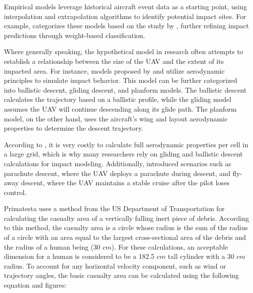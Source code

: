 \documentclass[12pt]{report}
\begin{document}
            Empirical models leverage historical aircraft event data as a starting point, using interpolation and
            extrapolation algorithms to identify potential impact sites. For example, \cite{melnyk_third-party_2014}
            categorizes these models based on the study by \cite{ale_assessment_2000}, further refining impact
            predictions through weight-based classification.
                
            Where generally speaking, the hypothetical model in research often attempts to establish a relationship
            between the size of the UAV and the extent of its impacted area. For instance, models proposed by
            \cite{primatesta_ground_2020} and \cite{burke_system-level_2011} utilize aerodynamic principles to simulate
            impact behavior. This model can be further categorized into ballistic descent, gliding descent, and planform
            models. The ballistic descent calculates the trajectory based on a ballistic profile, while the gliding
            model assumes the UAV will continue descending along its glide path. The planform model, on the other hand,
            uses the aircraft's wing and layout aerodynamic properties to determine the descent trajectory.
                
            According to \cite{primatesta_risk-based_2020}, it is very costly to calculate full aerodynamic properties
            per cell in a large grid, which is why many researchers rely on gliding and ballistic descent calculations
            for impact modeling. Additionally, \cite{primatesta_ground_2020} introduced scenarios such as parachute
            descent, where the UAV deploys a parachute during descent, and fly-away descent, where the UAV maintains a
            stable cruise after the pilot loses control.
                
            Primatesta uses a method from the US Department of Transportation \cite{faa_expected_2000} for calculating
            the casualty area of a vertically falling inert piece of debris. According to this method, the casualty area
            is a circle whose radius is the sum of the radius of a circle with an area equal to the largest
            cross-sectional area of the debris and the radius of a human being (30 \(cm\)). For these calculations, an
            acceptable dimension for a human is considered to be a 182.5 \(cm\) tall cylinder with a 30 \(cm\) radius.
            To account for any horizontal velocity component, such as wind or trajectory angles, the basic casualty area
            can be calculated using the following equation and figures:
\end{document}
